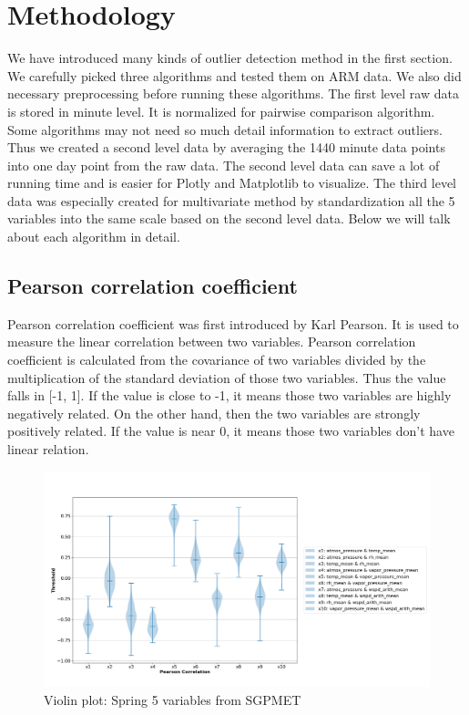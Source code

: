 \documentclass[letterpaper, 10 pt, conference]{ieeeconf}  %
\begin{document}
\section{Methodology}
We have introduced many kinds of outlier detection method in the first section. We carefully picked three algorithms and tested them on ARM data. We also did necessary preprocessing before running these algorithms. The first level raw data is stored in minute level. It is normalized for pairwise comparison algorithm. Some algorithms may not need so much detail information to extract outliers. Thus we created a second level data by averaging the 1440 minute data points into one day point from the raw data. The second level data can save a lot of running time and is easier for Plotly \cite{plotly} and Matplotlib \cite{Hunter:2007} to visualize. The third level data was especially created for multivariate method by standardization all the 5 variables into the same scale based on the second level data. Below we will talk about each algorithm in detail. 

\subsection{Pearson correlation coefficient} 
Pearson correlation coefficient was first introduced by Karl Pearson\cite{pearson1895note}. It is used to measure the linear correlation between two variables. Pearson correlation coefficient is calculated from the covariance of two variables divided by the multiplication of the standard deviation of those two variables. Thus the value falls in [-1, 1]. If the value is close to -1, it means those two variables are highly negatively related. On the other hand, then the two variables are strongly positively related. If the value is near 0, it means those two variables don't have linear relation. 

\begin{figure}[ht]
    \centering
    \includegraphics[width=\textwidth]{Spring.png}
    \caption{Violin plot: Spring 5 variables from SGPMET}
    \label{fig:pc}
\end{figure}
\end{document}

